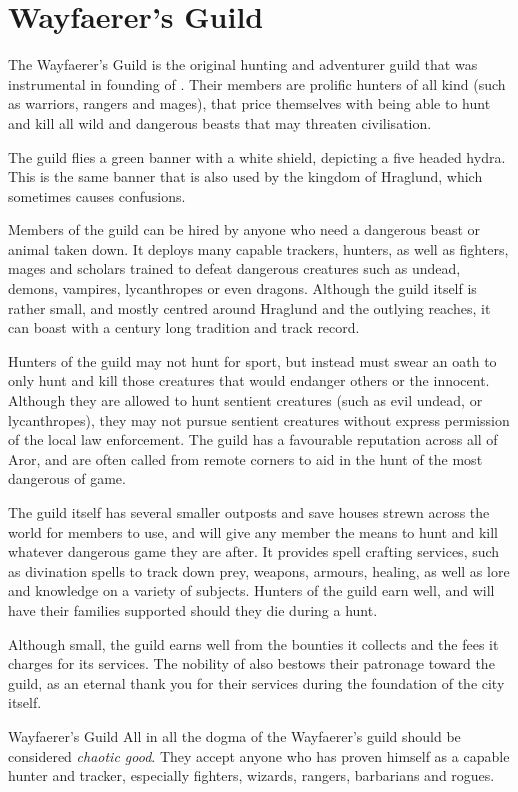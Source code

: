 \section{Wayfaerer's Guild}
\label{sec:Wayfaerers Guild}

The Wayfaerer's Guild is the original hunting and adventurer guild that was
instrumental in founding of . Their members are prolific
hunters of all kind (such as warriors, rangers and mages), that price themselves
with being able to hunt and kill all wild and dangerous beasts that may threaten
civilisation.

The guild flies a green banner with a white shield, depicting a five headed
hydra. This is the same banner that is also used by the kingdom of Hraglund,
which sometimes causes confusions.

Members of the guild can be hired by anyone who need a dangerous beast or animal
taken down. It deploys many capable trackers, hunters, as well as fighters,
mages and scholars trained to defeat dangerous creatures such as undead, demons,
vampires, lycanthropes or even dragons. Although the guild itself is rather
small, and mostly centred around Hraglund and the outlying reaches, it can boast
with a century long tradition and track record.

Hunters of the guild may not hunt for sport, but instead must swear an oath to
only hunt and kill those creatures that would endanger others or the innocent.
Although they are allowed to hunt sentient creatures (such as evil undead, or
lycanthropes), they may not pursue sentient creatures without express permission
of the local law enforcement. The guild has a favourable reputation across all
of Aror, and are often called from remote corners to aid in the hunt of the
most dangerous of game.

The guild itself has several smaller outposts and save houses strewn across the
world for members to use, and will give any member the means to hunt and kill
whatever dangerous game they are after. It provides spell crafting services,
such as divination spells to track down prey, weapons, armours, healing, as well
as lore and knowledge on a variety of subjects. Hunters of the guild earn well,
and will have their families supported should they die during a hunt.

Although small, the guild earns well from the bounties it collects and the fees
it charges for its services. The nobility of  also bestows
their patronage toward the guild, as an eternal thank you for their services
during the foundation of the city itself.

\begin{35e}{Wayfaerer's Guild}
  All in all the dogma of the Wayfaerer's guild should be considered
  \emph{chaotic good}. They accept anyone who has proven himself as a capable
  hunter and tracker, especially fighters, wizards, rangers, barbarians and
  rogues.
\end{35e}
